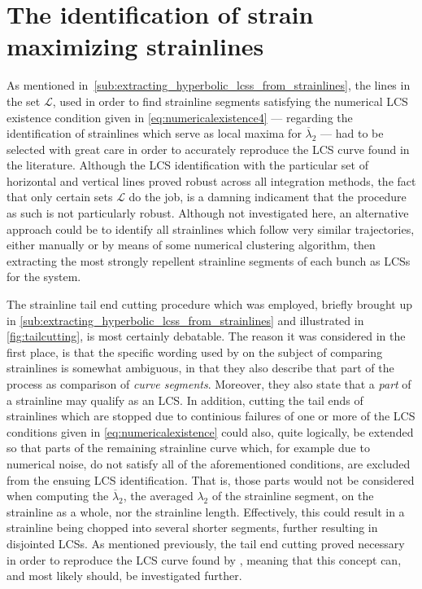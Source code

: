 \section{The identification of strain maximizing strainlines}
\label{sec:the_identification_of_strain_maximizing_strainlines}

As mentioned in~\cref{sub:extracting_hyperbolic_lcss_from_strainlines},
the lines in the set $\mathcal{L}$, used in order to find strainline segments
satisfying the numerical LCS existence condition given in
\cref{eq:numericalexistence4} --- regarding the identification of strainlines
which serve as local maxima for $\overline{\lambda}_{2}$ --- had to be selected
with great care in order to accurately reproduce the LCS curve found in the
literature. Although the LCS identification with the particular set of
horizontal and vertical lines proved robust across all integration methods, the
fact that only certain sets $\mathcal{L}$ do the job, is a damning indicament
that the procedure as such is not particularly robust. Although not investigated
here, an alternative approach could be to identify all strainlines which follow
very similar trajectories, either manually or by means of some numerical
clustering algorithm, then extracting the most strongly repellent strainline
segments of each bunch as LCSs for the system.

The strainline tail end cutting procedure which was employed, briefly brought
up in
\cref{sub:extracting_hyperbolic_lcss_from_strainlines} and illustrated in
\cref{fig:tailcutting}, is most certainly debatable. The reason it was
considered in the first place, is that the specific wording used by
\textcite{farazmand2012computing} on the subject of comparing strainlines is
somewhat ambiguous, in that they also describe that part of the process as
comparison of \emph{curve segments}. Moreover, they also state that a
\emph{part} of a strainline may qualify as an LCS. In addition, cutting the
tail ends of strainlines which are stopped due to continious failures of one
or more of the LCS conditions given in
\cref{eq:numericalexistence} could also, quite logically, be extended so that
parts of the remaining strainline curve which, for example due to numerical
noise, do not satisfy all of the aforementioned conditions, are excluded from
the ensuing LCS identification. That is, those parts would not be considered
when computing the $\overline{\lambda}_{2}$, the averaged $\lambda_{2}$ of
the strainline segment, on the strainline as a whole, nor
the strainline length. Effectively, this could result in a strainline being
chopped into several shorter segments, further resulting in
disjointed LCSs. As mentioned previously, the tail end cutting proved necessary
in order to reproduce the LCS curve found by \textcite{farazmand2012computing},
meaning that this concept can, and most likely should, be investigated further.

